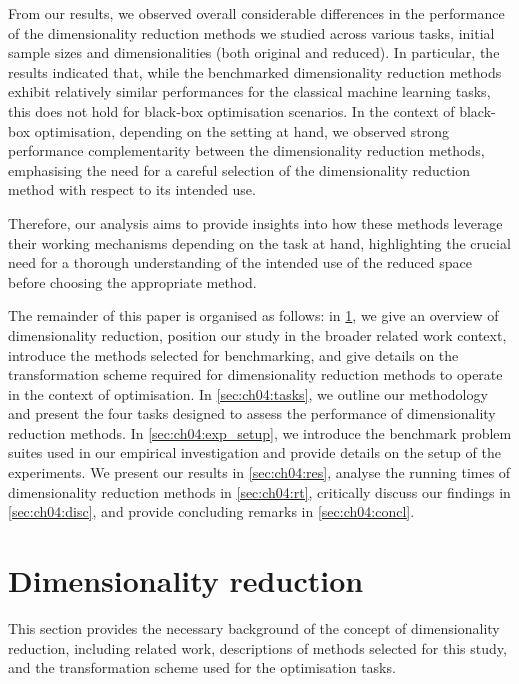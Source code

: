 From our results, we observed overall considerable differences in the performance of the dimensionality reduction methods we studied across various tasks, initial sample sizes and dimensionalities (both original and reduced).
In particular, the results indicated that, while the benchmarked dimensionality reduction methods exhibit relatively similar performances for the classical machine learning tasks, this does not hold for black-box optimisation scenarios.
In the context of black-box optimisation, depending on the setting at hand, we observed strong performance complementarity between the dimensionality reduction methods, emphasising the need for a careful selection of the dimensionality reduction method with respect to its intended use.

Therefore, our analysis aims to provide insights into how these methods leverage their working mechanisms depending on the task at hand, highlighting the crucial need for a thorough understanding of the intended use of the reduced space before choosing the appropriate method.

The remainder of this paper is organised as follows: in \cref{sec:ch04:dim_red}, we give an overview of dimensionality reduction, position our study in the broader related work context, introduce the methods selected for benchmarking, and give details on the transformation scheme required for dimensionality reduction methods to operate in the context of optimisation.
In \cref{sec:ch04:tasks}, we outline our methodology and present the four tasks designed to assess the performance of dimensionality reduction methods.
In \cref{sec:ch04:exp_setup}, we introduce the benchmark problem suites used in our empirical investigation and provide details on the setup of the experiments.
We present our results in \cref{sec:ch04:res}, analyse the running times of dimensionality reduction methods in \cref{sec:ch04:rt}, critically discuss our findings in \cref{sec:ch04:disc}, and provide concluding remarks in \cref{sec:ch04:concl}.

\section{Dimensionality reduction}
\label{sec:ch04:dim_red}


This section provides the necessary background of the concept of dimensionality reduction, including related work, descriptions of methods selected for this study, and the transformation scheme used for the optimisation tasks.


